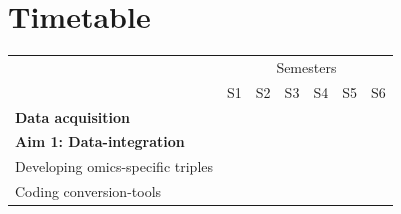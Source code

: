 \documentclass[twoside,fontsize=12pt]{article}
\begin{document}
\section*{Timetable}
\begin{table}[h]
\begin{center}
\begin{tabular}{lllllll}
                                                & \multicolumn{6}{c}{Semesters}                                                                                                                                                                                                                                                                                                                                                                                 \\ \cline{2-7} 
                                                & S1                                              & S2                                              & S3                                              & S4                                              & S5                                              & S6                                                                                          \\ \hline
\textbf{Data acquisition}               &           & \cellcolor[HTML]{343434}{\color[HTML]{656565} } & \cellcolor[HTML]{343434}{\color[HTML]{656565} } & \cellcolor[HTML]{343434}{\color[HTML]{656565} } & \cellcolor[HTML]{343434}{\color[HTML]{656565} } & \cellcolor[HTML]{343434}{\color[HTML]{656565} }   \\
\textbf{Aim 1: Data-integration}                & \cellcolor[HTML]{343434}                        & \cellcolor[HTML]{343434}                                             &                                                 &                                                 &                                                                                              \\
\hspace*{1em} Developing omics-specific triples & \cellcolor[HTML]{656565}                        &                                                 &                                                 &                                                 &                                                 &                                                                                                 \\
\hspace*{1em} Coding conversion-tools           &                                                 \cellcolor[HTML]{656565}               &     \cellcolor[HTML]{656565}         &                      &                                                 &                                                 &                                                                                                \\

\end{tabular}
\end{center}
\end{table}
\end{document}
